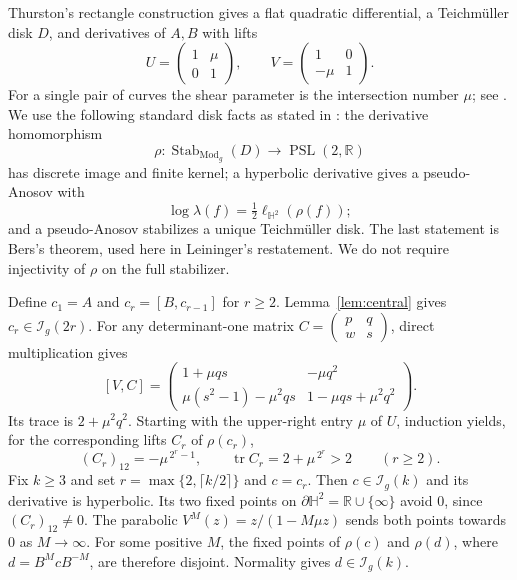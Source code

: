 \documentclass[11pt]{article}
\theoremstyle{remark}\newtheorem*{remark}{Remark}
\newcommand{\Mod}{\operatorname{Mod}}
\newcommand{\tr}{\operatorname{tr}}
\newcommand{\PSL}{\operatorname{PSL}}
\newcommand{\HH}{\mathbb H^2}
\newcommand{\I}{\mathcal I}
\begin{document}
Thurston's rectangle construction gives a flat quadratic differential,
a Teichm\"uller disk $D$, and derivatives of $A,B$ with lifts
\begin{equation}\label{eq:AB}
 U=\begin{pmatrix}1&\mu\\0&1\end{pmatrix},\qquad
 V=\begin{pmatrix}1&0\\-\mu&1\end{pmatrix}.
\end{equation}
For a single pair of curves the shear parameter is the intersection
number $\mu$; see \cite[\S5.1 and Lemma 6.3]{Leininger}.
We use the following standard disk facts as stated in
\cite[Theorems 3.1--3.2]{Leininger}: the derivative homomorphism
\[
 \rho:\operatorname{Stab}_{\Mod_g}(D)\longrightarrow\PSL(2,\mathbb R)
\]
has discrete image and finite kernel; a hyperbolic derivative gives a
pseudo-Anosov with
\begin{equation}\label{eq:normalization}
 \log\lambda(f)=\tfrac12\ell_{\HH}(\rho(f));
\end{equation}
and a pseudo-Anosov stabilizes a unique Teichm\"uller disk.
The last statement is Bers's theorem, used here in Leininger's
restatement. We do not require injectivity of $\rho$ on the full stabilizer.

Define $c_1=A$ and $c_r=[B,c_{r-1}]$ for $r\ge2$.
Lemma~\ref{lem:central} gives $c_r\in\I_g(2r)$.
For any determinant-one matrix $C=\left(\begin{smallmatrix}p&q\\w&s\end{smallmatrix}\right)$,
direct multiplication gives
\[
 [V,C]=\begin{pmatrix}
 1+\mu qs&-\mu q^2\\
 \mu(s^2-1)-\mu^2qs&1-\mu qs+\mu^2q^2
 \end{pmatrix}.
\]
Its trace is $2+\mu^2q^2$. Starting with the upper-right entry $\mu$ of
$U$, induction yields, for the corresponding lifts $C_r$ of $\rho(c_r)$,
\begin{equation}\label{eq:deep}
 (C_r)_{12}=-\mu^{\,2^r-1},\qquad
 \tr C_r=2+\mu^{\,2^r}>2 \qquad(r\ge2).
\end{equation}
Fix $k\ge3$ and set $r=\max\{2,\lceil k/2\rceil\}$ and $c=c_r$.
Then $c\in\I_g(k)$ and its derivative is hyperbolic.
Its two fixed points on $\partial\HH=\mathbb R\cup\{\infty\}$ avoid $0$,
since $(C_r)_{12}\ne0$. The parabolic
$V^M(z)=z/(1-M\mu z)$ sends both points towards $0$ as $M\to\infty$.
For some positive $M$, the fixed points of $\rho(c)$ and
$\rho(d)$, where $d=B^McB^{-M}$, are therefore disjoint.
Normality gives $d\in\I_g(k)$.
\end{document}

